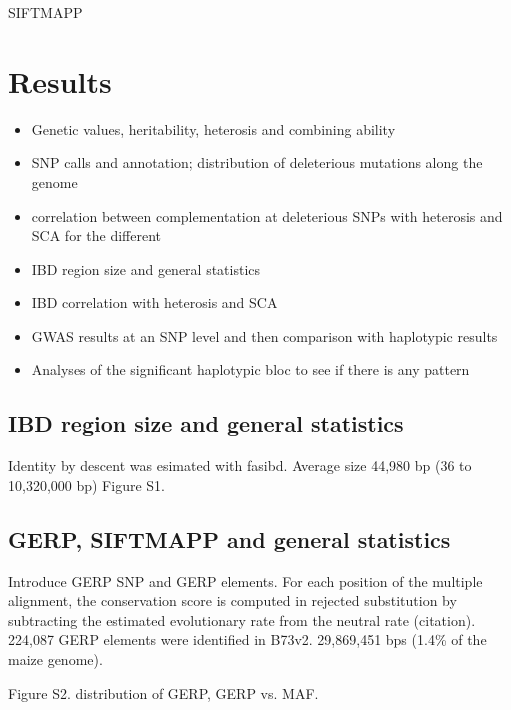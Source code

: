 \documentclass[10pt]{article}
\begin{document}
SIFTMAPP 



\section*{Results}

\begin{itemize}
  \item Genetic values, heritability, heterosis and combining ability 
  \item SNP calls and annotation; distribution of deleterious mutations along the genome 
  \item correlation between complementation at deleterious SNPs with heterosis and SCA for the different 
  \item IBD region size and general statistics 
  \item IBD correlation with heterosis and SCA
  \item GWAS results at an SNP level and then comparison with haplotypic results 
  \item Analyses of the significant haplotypic bloc to see if there is any pattern
\end{itemize}

\subsection*{IBD region size and general statistics}

Identity by descent was esimated with fasibd.
Average size 44,980 bp (36 to 10,320,000 bp)
Figure S1.



\subsection*{GERP, SIFTMAPP and general statistics}

Introduce GERP SNP and GERP elements. For each position of the multiple alignment, the conservation score is computed in rejected substitution by subtracting the estimated evolutionary rate from the neutral rate (citation).
224,087 GERP elements were identified in B73v2. 
29,869,451 bps (1.4\% of the maize genome).


Figure S2. distribution of GERP, GERP vs. MAF.
\end{document}
